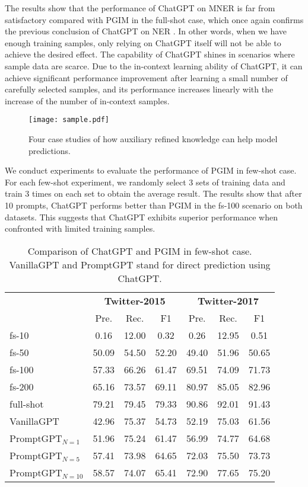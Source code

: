 \documentclass[11pt]{article}
\begin{document}
The results show that the performance of ChatGPT on MNER is far from satisfactory compared with PGIM in the full-shot case, which once again confirms the previous conclusion of ChatGPT on NER \citep{qin2023chatgpt}. 
In other words, when we have enough training samples, only relying on ChatGPT itself will not be able to achieve the desired effect.
The capability of ChatGPT shines in scenarios where sample data are scarce. 
Due to the in-context learning ability of ChatGPT, it can achieve significant performance improvement after learning a small number of carefully selected samples, and its performance increases linearly with the increase of the number of in-context samples. 
\begin{figure*}
	\centering
	\texttt{[image: sample.pdf]}
	\caption{Four case studies of how auxiliary refined knowledge can help model predictions.}
	\label{fig:cases}
\end{figure*}
We conduct experiments to evaluate the performance of PGIM in few-shot case. 
For each few-shot experiment, we randomly select 3 sets of training data and train 3 times on each set to obtain the average result. The results show that after 10 prompts, ChatGPT performs better than PGIM in the fs-100 scenario on both datasets. This suggests that ChatGPT exhibits superior performance when confronted with limited training samples.


\begin{table}[t!]
\small
\setlength\tabcolsep{2.3pt}
\renewcommand{\arraystretch}{1.2}
\centering
\begin{tabular}{l|cccccc}
\toprule
& \multicolumn{3}{c|}{\textbf{Twitter-2015}} & \multicolumn{3}{c}{\textbf{Twitter-2017}}\\
& Pre. & Rec. & \multicolumn{1}{c|}{F1}  & Pre. & Rec. & \multicolumn{1}{c}{F1}    \\
\midrule
fs-10      & 0.16  & 12.00 & \multicolumn{1}{c|}{0.32}  & 0.26  & 12.95 & 0.51  \\
fs-50      & 50.09 & 54.50 & \multicolumn{1}{c|}{52.20} & 49.40 & 51.96 & 50.65 \\
fs-100     & 57.33 & 66.26 & \multicolumn{1}{c|}{61.47} & 69.51 & 74.09 & 71.73 \\
fs-200     & 65.16 & 73.57 & \multicolumn{1}{c|}{69.11} & 80.97 & 85.05 & 82.96 \\
full-shot  & 79.21 & 79.45 & \multicolumn{1}{c|}{79.33} & 90.86 & 92.01 & 91.43 \\
\midrule
VanillaGPT & 42.96 & 75.37 & \multicolumn{1}{c|}{54.73} & 52.19 & 75.03 & 61.56\\
PromptGPT$_{N=1}$ & 51.96 & 75.24 & \multicolumn{1}{c|}{61.47} & 56.99 & 74.77 & 64.68 \\
PromptGPT$_{N=5}$ & 57.41 & 73.98 & \multicolumn{1}{c|}{64.65} & 72.03 & 75.50 & 73.73 \\
PromptGPT$_{N=10}$ & 58.57 & 74.07 & \multicolumn{1}{c|}{65.41} & 72.90 & 77.65 & 75.20 \\
\bottomrule
\end{tabular}
\caption{Comparison of ChatGPT and PGIM in few-shot case. VanillaGPT and PromptGPT stand for direct prediction using ChatGPT.}
\label{tab:Prompt ChatGPT}
\end{table}
\end{document}
